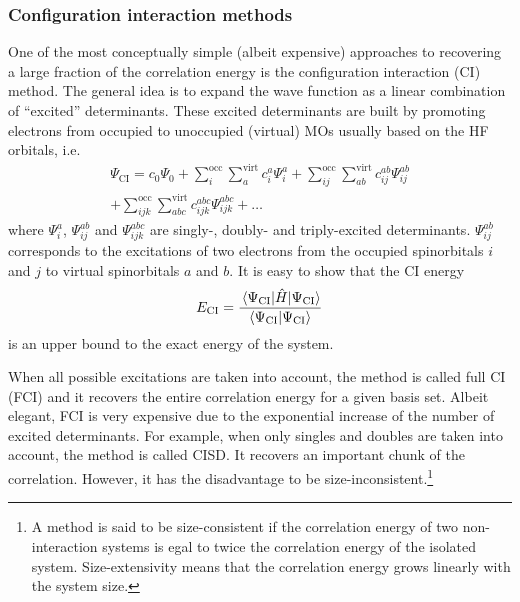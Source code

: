 \documentclass[aip,jcp,reprint,noshowkeys,superscriptaddress]{revtex4-1}
\begin{document}
\subsubsection*{Configuration interaction methods}
One of the most conceptually simple (albeit expensive) approaches to recovering a large fraction of the correlation energy is the configuration interaction (CI) method. \cite{SzaboBook,JensenBook,HelgakerBook}
The general idea is to expand the wave function as a linear combination of ``excited'' determinants.
These excited determinants are built by promoting electrons from occupied to unoccupied (virtual) MOs usually based on the HF orbitals, i.e.
\begin{multline} 
\label{eq:Psi-CI}
	\Psi_\text{CI}	= 					c_0 	\Psi_0 
		+ \sum_i^{\text{occ}} \sum_a^{\text{virt}} 		c_{i}^{a} 	\Psi_{i}^{a} 
		+ \sum_{ij}^{\text{occ}} \sum_{ab}^{\text{virt}} 	c_{ij}^{ab} 	\Psi_{ij}^{ab}
		\\
		+ \sum_{ijk}^{\text{occ}} \sum_{abc}^{\text{virt}}	c_{ijk}^{abc} 	\Psi_{ijk}^{abc}
		+ \ldots
\end{multline}
where $\Psi_{i}^{a} $, $\Psi_{ij}^{ab}$ and $\Psi_{ijk}^{abc}$ are singly-, doubly- and triply-excited determinants.
$\Psi_{ij}^{ab}$ corresponds to the excitations of two electrons from the occupied spinorbitals $i$ and $j$ to virtual spinorbitals $a$ and $b$. 
It is easy to show that the CI energy
\begin{equation}
	E_\text{CI} = \frac{\mel{\Psi_\text{CI}}{\Hat{H}}{\Psi_\text{CI}}}{\braket{\Psi_\text{CI}}{\Psi_\text{CI}}}
\end{equation}
is an upper bound to the exact energy of the system.

When all possible excitations are taken into account, the method is called full CI (FCI) and it recovers the entire correlation energy for a given basis set.
Albeit elegant, FCI is very expensive due to the exponential increase of the number of excited determinants.
For example, when only singles and doubles are taken into account, the method is called CISD. 
It recovers an important chunk of the correlation.
However, it has the disadvantage to be size-inconsistent.\footnote{A method is said to be size-consistent if the correlation energy of two non-interaction systems is egal to twice the correlation energy of the isolated system.
Size-extensivity means that the correlation energy grows linearly with the system size.}

\end{document}
